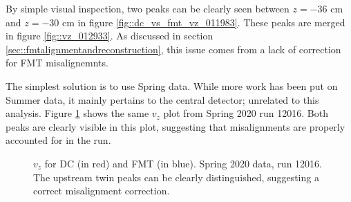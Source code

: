         By simple visual inspection, two peaks can be clearly seen between $z = -36$ cm and $z = -30$ cm in figure \ref{fig::dc_vs_fmt_vz_011983}.
        These peaks are merged in figure \ref{fig::vz_012933}.
        As discussed in section \ref{sec::fmtalignmentandreconstruction}, this issue comes from a lack of correction for FMT misalignemnts.

        The simplest solution is to use Spring data.
        While more work has been put on Summer data, it mainly pertains to the central detector; unrelated to this analysis.
        Figure \ref{fig::vz_012016} shows the same $v_z$ plot from Spring 2020 run 12016.
        Both peaks are clearly visible in this plot, suggesting that misalignments are properly accounted for in the run.

        \begin{figure}[b!]
            \centering{}
            \caption[$v_z$ for DC and FMT, run 12016]{$v_z$ for DC (in red) and FMT (in blue). Spring 2020 data, run 12016. The upstream twin peaks can be clearly distinguished, suggesting a correct misalignment correction.}
            \label{fig::vz_012016}
        \end{figure}




